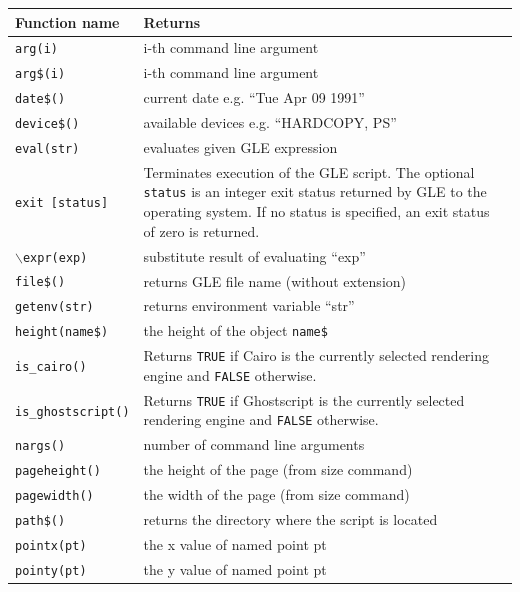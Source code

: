 \begin{supertabular}{lp{10cm}} \hline
Function name     & Returns  \\ \hline
{\tt arg(i)}        	    & i-th command line argument \\
{\tt arg\$(i)}             & i-th command line argument \\
{\tt date\$()}       	& current date e.g. ``Tue Apr 09 1991'' \\
{\tt device\$()}   	& available devices e.g. ``HARDCOPY, PS''\\
{\tt eval(str)}          	& evaluates given GLE expression \\
{\tt exit [status]}  & Terminates execution of the GLE script. The optional {\tt status} is an integer exit status returned by GLE to the operating system. If no status is specified, an exit status of zero is returned. \\
{\tt $\backslash{}$expr(exp)}  & substitute result of evaluating ``exp'' \\
{\tt file\$()}          & returns GLE file name (without extension) \\
{\tt getenv(str)}       & returns environment variable ``str''\\
{\tt height(name\$)}  	& the height of the object {\tt name\$} \\
{\tt is\_cairo()}  & Returns {\tt TRUE} if Cairo is the currently selected rendering engine and {\tt FALSE} otherwise. \\
{\tt is\_ghostscript()}  & Returns {\tt TRUE} if Ghostscript is the currently selected rendering engine and {\tt FALSE} otherwise. \\
{\tt nargs()}        	& number of command line arguments \\
{\tt pageheight()}  & the height of the page (from size command) \\
{\tt pagewidth()} 	& the width of the page (from size command) \\
{\tt path\$()}          & returns the directory where the script is located \\
{\tt pointx(pt)}     	& the x value of named point pt \\
{\tt pointy(pt)}     	& the y value of named point pt \\

\end{supertabular}
